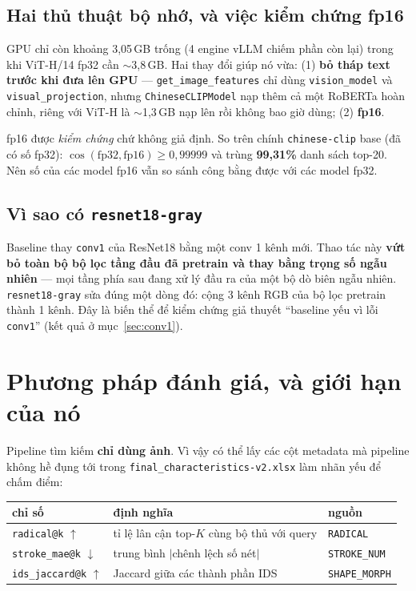 \documentclass[11pt,a4paper]{article}
\newcommand{\code}[1]{\texttt{#1}}
\newcommand{\up}{$\uparrow$}
\newcommand{\dn}{$\downarrow$}
\begin{document}
\subsection{Hai thủ thuật bộ nhớ, và việc kiểm chứng fp16}

GPU chỉ còn khoảng 3,05\,GB trống (4 engine vLLM chiếm phần còn lại) trong khi ViT-H/14 fp32 cần
$\sim$3,8\,GB. Hai thay đổi giúp nó vừa: (1) \textbf{bỏ tháp text trước khi đưa lên GPU} ---
\code{get\_image\_features} chỉ dùng \code{vision\_model} và \code{visual\_projection}, nhưng
\code{ChineseCLIPModel} nạp thêm cả một RoBERTa hoàn chỉnh, riêng với ViT-H là $\sim$1,3\,GB nạp
lên rồi không bao giờ dùng; (2) \textbf{fp16}.

fp16 được \emph{kiểm chứng} chứ không giả định. So trên chính \code{chinese-clip} base (đã có số
fp32): $\cos(\text{fp32}, \text{fp16}) \geq 0{,}99999$ và trùng \textbf{99,31\%} danh sách top-20.
Nên số của các model fp16 vẫn so sánh công bằng được với các model fp32.

\subsection{Vì sao có \code{resnet18-gray}}

Baseline thay \code{conv1} của ResNet18 bằng một conv 1 kênh mới. Thao tác này \textbf{vứt bỏ toàn
bộ bộ lọc tầng đầu đã pretrain và thay bằng trọng số ngẫu nhiên} --- mọi tầng phía sau đang xử lý
đầu ra của một bộ dò biên ngẫu nhiên. \code{resnet18-gray} sửa đúng một dòng đó: cộng 3 kênh RGB
của bộ lọc pretrain thành 1 kênh. Đây là biến thể để kiểm chứng giả thuyết ``baseline yếu vì lỗi
\code{conv1}'' (kết quả ở mục~\ref{sec:conv1}).

\section{Phương pháp đánh giá, và giới hạn của nó}

Pipeline tìm kiếm \textbf{chỉ dùng ảnh}. Vì vậy có thể lấy các cột metadata mà pipeline không hề
đụng tới trong \code{final\_characteristics-v2.xlsx} làm nhãn yếu để chấm điểm:

\begin{table}[h]
\centering
\begin{tabular}{lll}
\toprule
chỉ số & định nghĩa & nguồn \\
\midrule
\code{radical@k} \up & tỉ lệ lân cận top-$K$ cùng bộ thủ với query & \code{RADICAL} \\
\code{stroke\_mae@k} \dn & trung bình $|$chênh lệch số nét$|$ & \code{STROKE\_NUM} \\
\code{ids\_jaccard@k} \up & Jaccard giữa các thành phần IDS & \code{SHAPE\_MORPH} \\
\bottomrule
\end{tabular}
\end{table}
\end{document}
